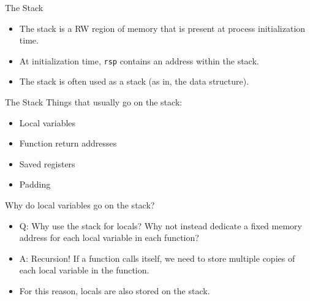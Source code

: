 \documentclass[hyphens,aspectratio=169]{beamer}
\begin{document}
\begin{frame}[fragile]{The Stack}
    \begin{itemize}
        \pause \item The stack is a RW region of memory that is present at process initialization time.
        \pause \item At initialization time, \texttt{rsp} contains an address within the stack.
        \pause \item The stack is often used as a stack (as in, the data structure).
    \end{itemize}
\end{frame}

\begin{frame}[fragile]{The Stack}
    Things that usually go on the stack:
    \begin{itemize}
        \pause \item Local variables
        \pause \item Function return addresses
        \pause \item Saved registers
        \pause \item Padding
    \end{itemize}
\end{frame}

\begin{frame}[fragile]{Why do local variables go on the stack?}
    \begin{itemize}
        \pause \item Q: Why use the stack for locals? Why not instead dedicate a fixed memory address for each local variable in each function?
        \pause \item A: Recursion! If a function calls itself, we need to store multiple copies of each local variable in the function.
        \pause \item For this reason, locals are also stored on the stack.
    \end{itemize}
\end{frame}
\end{document}
